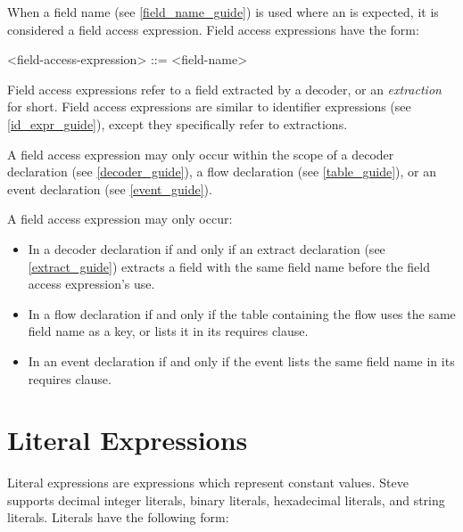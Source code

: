 When a field name (see \ref{field_name_guide}) is used where an  is expected, it is considered a field access expression. Field access expressions have the form:

\begin{minip}
\begin{grammar}
<field-access-expression> ::= <field-name>
\end{grammar}
\end{minip}

Field access expressions refer to a field extracted by a decoder, or an \textit{extraction} for short. Field access expressions are similar to identifier expressions (see \ref{id_expr_guide}), except they specifically refer to extractions.

A field access expression may only occur within the scope of a decoder declaration (see \ref{decoder_guide}), a flow declaration (see \ref{table_guide}), or an event declaration (see \ref{event_guide}).

A field access expression may only occur:
\begin{itemize}
\item In a decoder declaration if and only if an extract declaration (see \ref{extract_guide}) extracts a field with the same field name before the field access expression's use.

\item In a flow declaration if and only if the table containing the flow uses the same field name as a key, or lists it in its requires clause.

\item In an event declaration if and only if the event lists the same field name in its requires clause.
\end{itemize}

\section{Literal Expressions} \label{literal_expr_guide}

Literal expressions are expressions which represent constant values. Steve supports decimal integer literals, binary literals, hexadecimal literals, and string literals. Literals have the following form:

